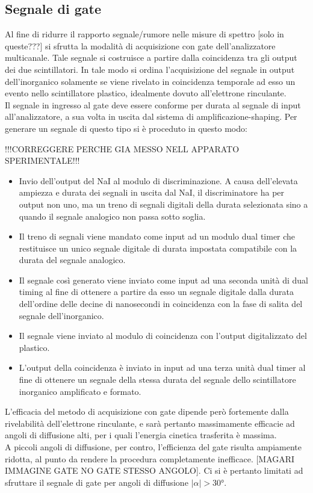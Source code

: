 \documentclass[8pt]{extarticle}
\begin{document}
\subsection{Segnale di gate} \label{subsec:gate}
Al fine di ridurre il rapporto segnale/rumore nelle misure di spettro [solo in queste???] si sfrutta la modalità di acquisizione con gate dell'analizzatore multicanale. Tale segnale si costruisce a partire dalla coincidenza tra gli output dei due scintillatori. In tale modo si ordina l'acquisizione del segnale in output dell'inorganico solamente se viene rivelato in coincidenza temporale ad esso un evento nello scintillatore plastico, idealmente dovuto all'elettrone rinculante.
\\
Il segnale in ingresso al gate deve essere conforme per durata al segnale di input all'analizzatore, a sua volta in uscita dal sistema di amplificazione-shaping. Per generare un segnale di questo tipo si è proceduto in questo modo:

!!!CORREGGERE PERCHE GIA MESSO NELL APPARATO SPERIMENTALE!!!
\begin{itemize}
	\item Invio dell'output del NaI al modulo di discriminazione. A causa dell'elevata ampiezza e durata dei segnali in uscita dal NaI, il discriminatore ha per output non uno, ma un treno di segnali digitali della durata selezionata sino a quando il segnale analogico non passa sotto soglia.
	\item Il treno di segnali viene mandato come input ad un modulo dual timer che restituisce un unico segnale digitale di durata impostata compatibile con la durata del segnale analogico.
	\item Il segnale così generato viene inviato come input ad una seconda unità di dual timing al fine di ottenere a partire da esso un segnale digitale dalla durata dell'ordine delle decine di nanosecondi in coincidenza con la fase di salita del segnale dell'inorganico.
	\item Il segnale viene inviato al modulo di coincidenza con l'output digitalizzato del plastico.
	\item L'output della coincidenza è inviato in input ad una terza unità dual timer al fine di ottenere un segnale della stessa durata del segnale dello scintillatore inorganico amplificato e formato.
\end{itemize}

L'efficacia del metodo di acquisizione con gate dipende però fortemente dalla rivelabilità dell'elettrone rinculante, e sarà pertanto massimamente efficacie ad angoli di diffusione alti, per i quali l'energia cinetica trasferita è massima. \\
A piccoli angoli di diffusione, per contro, l'efficienza del gate risulta ampiamente ridotta, al punto da rendere la procedura completamente inefficace. [MAGARI IMMAGINE GATE NO GATE STESSO ANGOLO]. Ci si è pertanto limitati ad sfruttare il segnale di gate per angoli di diffusione $|\alpha|>30°$. 
\end{document}

